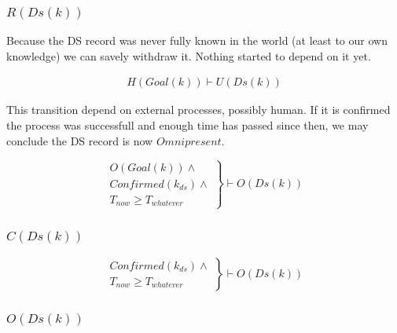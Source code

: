 \documentclass[twoside,english, a4paper]{article}
\newcommand{\highlightMinSig}[1]{\textcolor{MinSig}{\bf{#1}}}
\newcommand{\mathbox}[1]{#1}
\begin{document}
\subsubsection{$R(Ds(k))$}

\mathbox{
	
	Because the DS record was never fully known in the world (at 
	least to our own knowledge) we can savely withdraw it. Nothing 
	started to depend on it yet.
	
	\begin{equation}
		\begin{split}
			H(Goal(k)) \vdash U(Ds(k))
		\end{split}
	\end{equation}

	This transition depend on external processes, possibly human. If it 
	is confirmed the process was successfull and enough time has passed
	since then, we may conclude the DS record is now $Omnipresent$.
	
	\begin{equation}
		\left.
		\begin{array}{l}
			O(Goal(k)) \wedge \\
			Confirmed(k_{ds}) \wedge \\
			T_{now} \geq T_{whatever}
		\end{array}
		\right\}\vdash O(Ds(k))
	\end{equation}
}

\subsubsection{$C(Ds(k))$}

\highlightMinSig{	\begin{equation}
		\left.
		\begin{array}{l}
			Confirmed(k_{ds}) \wedge \\
			T_{now} \geq T_{whatever}
		\end{array}
		\right\}\vdash O(Ds(k))
	\end{equation}}


\subsubsection{$O(Ds(k))$}
\end{document}
